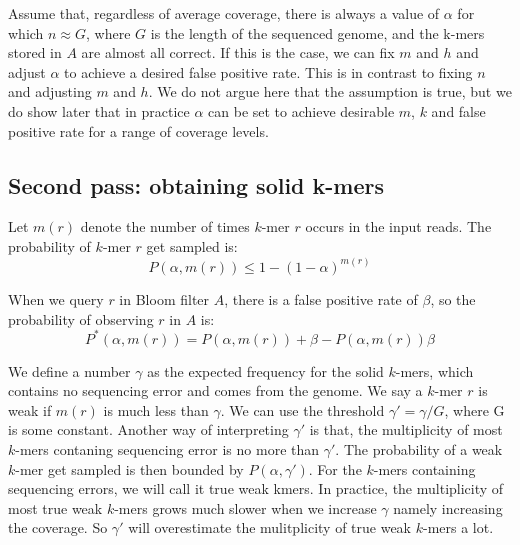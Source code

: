 \documentclass[10pt]{article}
\begin{document}
Assume that, regardless of average coverage, there is always a value of $\alpha$ for which $n \approx G$, where $G$ is the length of the sequenced genome, and the k-mers stored in $A$ are almost all correct.  If this is the case, we can fix $m$ and $h$ and adjust $\alpha$ to achieve a desired false positive rate.  This is in contrast to fixing $n$ and adjusting $m$ and $h$.  We do not argue here that the assumption is true, but we do show later that in practice $\alpha$ can be set to achieve desirable $m$, $k$ and false positive rate for a range of coverage levels.


\subsection*{Second pass: obtaining solid k-mers}

Let $m(r)$ denote the number of times $k$-mer $r$ occurs in the input reads. The probability of $k$-mer $r$ get sampled is: 
$$P(\alpha, m(r)) \leq 1-(1-\alpha)^{m(r)}$$

When we query $r$ in Bloom filter $A$, there is a false positive rate of $\beta$, so the probability of observing $r$ in $A$ is:
$$P^*(\alpha, m(r))=P(\alpha, m(r))+\beta-P(\alpha, m(r))\beta$$

We define a number $\gamma$ as the expected frequency for the solid $k$-mers, which contains no sequencing error and comes from the genome. We say a $k$-mer $r$ is weak if $m(r)$ is much less than $\gamma$. We can use the threshold $\gamma'=\gamma/G$, where G is some constant. Another way of interpreting $\gamma'$ is that, the multiplicity of most $k$-mers contaning sequencing error is no more than $\gamma'$. The probability of a weak $k$-mer get sampled is then bounded by $P(\alpha, \gamma')$. For the $k$-mers containing sequencing errors, we will call it true weak kmers. In practice, the multiplicity of most true weak $k$-mers grows much slower when we increase $\gamma$ namely increasing the coverage. So $\gamma'$ will overestimate the mulitplicity of true weak $k$-mers a lot. 
\end{document}
